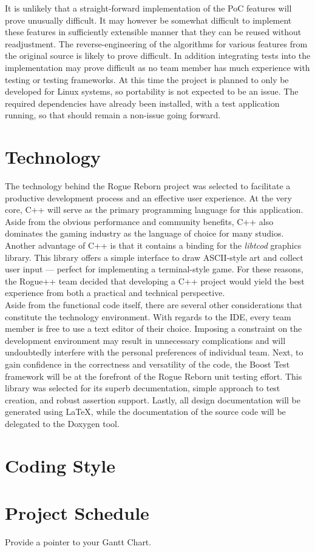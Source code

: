 \documentclass{article}
\begin{document}
It is unlikely that a straight-forward implementation of the PoC features will prove unusually difficult. It may however be somewhat difficult to implement these features in sufficiently extensible manner that they can be reused without readjustment. The reverse-engineering of the algorithms for various features from the original source is likely to prove difficult. In addition integrating tests into the implementation may prove difficult as no team member has much experience with testing or testing frameworks. At this time the project is planned to only be developed for Linux systems, so portability is not expected to be an issue. The required dependencies have already been installed, with a test application running, so that should remain a non-issue going forward. 

\section{Technology}

The technology behind the Rogue Reborn project was selected to facilitate a productive development process and an effective user experience.  At the very core, C++ will serve as the primary programming language for this application.  Aside from the obvious performance and community benefits, C++ also dominates the gaming industry as the language of choice for many studios.  Another advantage of C++ is that it contains a binding for the \textit{libtcod} graphics library.  This library offers a simple interface to draw ASCII-style art and collect user input --- perfect for implementing a terminal-style game.  For these reasons, the Rogue++ team decided that developing a C++ project would yield the best experience from both a practical and technical perspective.\\

Aside from the functional code itself, there are several other considerations that constitute the technology environment.  With regards to the IDE, every team member is free to use a text editor of their choice.  Imposing a constraint on the development environment may result in unnecessary complications and will undoubtedly interfere with the personal preferences of individual team.  Next, to gain confidence in the correctness and versatility of the code, the Boost Test framework will be at the forefront of the Rogue Reborn unit testing effort.  This library was selected for its superb decumentation, simple approach to test creation, and robust assertion support.  Lastly, all design documentation will be generated using LaTeX, while the documentation of the source code will be delegated to the Doxygen tool.

\section{Coding Style}

\section{Project Schedule}

Provide a pointer to your Gantt Chart.
\end{document}
